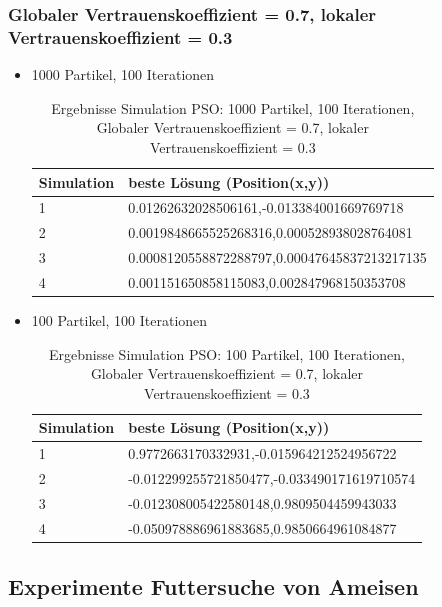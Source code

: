 \documentclass[a4paper, 11pt]{article}
\begin{document}
\subsubsection{Globaler Vertrauenskoeffizient = 0.7, lokaler Vertrauenskoeffizient = 0.3}
\begin{itemize}
	\item 1000 Partikel, 100 Iterationen
	\begin{table}[h]
		\begin{tabular}{p{2.5cm}|p{11cm}}
			Simulation & beste Lösung (Position(x,y))\\ \hline\hline
			1 & 0.01262632028506161,-0.013384001669769718\\ \hline
			2 & 0.0019848665525268316,0.000528938028764081\\ \hline
			3 & 0.0008120558872288797,0.00047645837213217135\\ \hline
			4 & 0.001151650858115083,0.002847968150353708\\ \hline
		\end{tabular}
		\caption{Ergebnisse Simulation \acs{PSO}: 1000 Partikel, 100 Iterationen, Globaler Vertrauenskoeffizient = 0.7, lokaler Vertrauenskoeffizient = 0.3}
		\label{tabframework}
	\end{table}
	\item 100 Partikel, 100 Iterationen
	\begin{table}[h]
		\begin{tabular}{p{2.5cm}|p{11cm}}
			Simulation & beste Lösung (Position(x,y))\\ \hline\hline
			1 & 0.9772663170332931,-0.015964212524956722\\ \hline
			2 & -0.012299255721850477,-0.033490171619710574\\ \hline
			3 & -0.012308005422580148,0.9809504459943033\\ \hline
			4 & -0.050978886961883685,0.9850664961084877\\ \hline
		\end{tabular}
		\caption{Ergebnisse Simulation \acs{PSO}: 100 Partikel, 100 Iterationen, Globaler Vertrauenskoeffizient = 0.7, lokaler Vertrauenskoeffizient = 0.3}
		\label{tabframework}
	\end{table}
\end{itemize}
\newpage

\subsection{Experimente Futtersuche von Ameisen}
\end{document}
